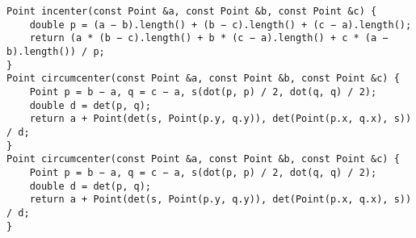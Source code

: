 \begin{lstlisting}
Point incenter(const Point &a, const Point &b, const Point &c) {
	double p = (a − b).length() + (b − c).length() + (c − a).length();
	return (a * (b − c).length() + b * (c − a).length() + c * (a − b).length()) / p;
}
Point circumcenter(const Point &a, const Point &b, const Point &c) {
	Point p = b − a, q = c − a, s(dot(p, p) / 2, dot(q, q) / 2);
	double d = det(p, q);
	return a + Point(det(s, Point(p.y, q.y)), det(Point(p.x, q.x), s)) / d;
}
Point circumcenter(const Point &a, const Point &b, const Point &c) {
	Point p = b − a, q = c − a, s(dot(p, p) / 2, dot(q, q) / 2);
	double d = det(p, q);
	return a + Point(det(s, Point(p.y, q.y)), det(Point(p.x, q.x), s)) / d;
}
\end{lstlisting}
